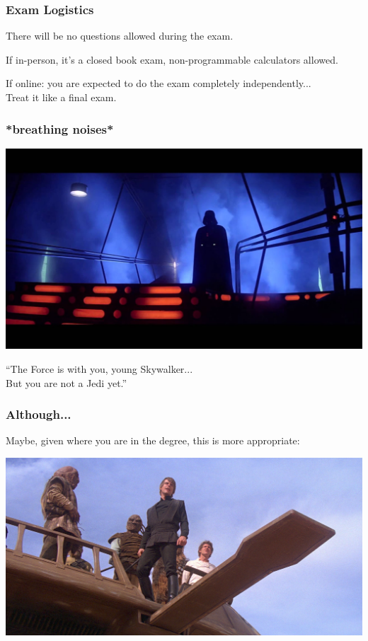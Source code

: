 \begin{frame}
\frametitle{Exam Logistics}
There will be no questions allowed during the exam.

If in-person, it's a closed book exam, non-programmable calculators allowed.

If online: you are expected to do the exam completely independently...\\
\quad Treat it like a final exam.


\end{frame}



\begin{frame}
\frametitle{*breathing noises*}

\begin{center}
	\includegraphics[width=\textwidth]{images/vader.jpg}
\end{center}

``The Force is with you, young Skywalker...\\
\quad But you are not a Jedi yet.''


\end{frame}

\begin{frame}
\frametitle{Although...}

Maybe, given where you are in the degree, this is more appropriate:

\begin{center}
	\includegraphics[width=\textwidth]{images/skiff.jpeg}
\end{center}



\end{frame}




